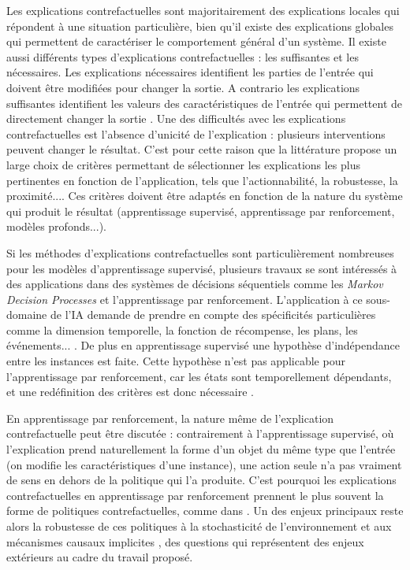 Les explications contrefactuelles sont majoritairement des explications locales qui répondent à une situation particulière, bien qu'il existe des explications globales qui permettent de caractériser le comportement général d'un système. Il existe aussi différents types d'explications contrefactuelles : les suffisantes et les nécessaires. Les explications nécessaires identifient les parties de l'entrée qui doivent être modifiées pour changer la sortie. A contrario les explications suffisantes identifient les valeurs des caractéristiques de l'entrée qui permettent de directement changer la sortie \parencite{amgoud2026axiomaticfoundationscounterfactualexplanations}. Une des difficultés avec  les explications contrefactuelles est l'absence d'unicité de l'explication : plusieurs interventions peuvent changer le résultat. C'est pour cette raison que la littérature propose un large choix de critères permettant de sélectionner les explications les plus pertinentes en fonction de l'application, tels que l'actionnabilité, la robustesse, la proximité...\parencite{verma2022counterfactualexplanationsalgorithmicrecourses}. Ces critères doivent être adaptés en fonction de la nature du système qui produit le résultat (apprentissage supervisé, apprentissage par renforcement, modèles profonds...).

Si les méthodes d'explications contrefactuelles sont particulièrement nombreuses pour les modèles d'apprentissage supervisé, plusieurs travaux se sont intéressés à des applications dans des systèmes de décisions séquentiels comme les \textit{Markov Decision Processes} et l'apprentissage par renforcement. L'application à ce sous-domaine de l'IA demande de prendre en compte des spécificités particulières comme la dimension temporelle, la fonction de récompense, les plans, les événements... \parencite{gajcin2024redefining}. De plus en apprentissage supervisé une hypothèse d'indépendance entre les instances est faite. Cette hypothèse n'est pas applicable pour l'apprentissage par renforcement, car les états sont temporellement dépendants, et une redéfinition des critères est donc nécessaire \parencite{gajcin2024redefining}.

En apprentissage par renforcement, la nature même de l'explication contrefactuelle peut être discutée : contrairement à l'apprentissage supervisé, où l'explication prend naturellement la forme d'un objet du même type que l'entrée (on modifie les caractéristiques d'une instance), une action seule n'a pas vraiment de sens en dehors de la politique qui l'a produite. C'est pourquoi les explications contrefactuelles en apprentissage par renforcement prennent le plus souvent la forme de politiques contrefactuelles, comme dans \parencite{dong_counterfactual_2025}. Un des enjeux principaux reste alors la robustesse de ces politiques à la stochasticité de l'environnement et aux mécanismes causaux implicites \parencite{DBLP:journals/corr/abs-1811-06272, lally2026robustcounterfactualinferencemarkov}, des questions qui représentent des enjeux extérieurs au cadre du travail proposé.






